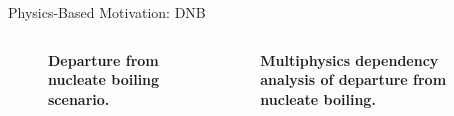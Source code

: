 \documentclass{beamer}
\begin{document}
\begin{frame}{Physics-Based Motivation: DNB}

  \begin{columns}

    \begin{column}{0.35\textwidth}
      \begin{figure}[htpb!]
        \begin{center}
          \scalebox{1}{  }
        \end{center}
        \caption{\textbf{Departure from nucleate boiling scenario.} }
      \end{figure}
    \end{column}

    \pause

    \begin{column}{0.65\textwidth}
      \begin{figure}[htpb!]
        \begin{center}
          \scalebox{0.8}{  }
        \end{center}
        \caption{\textbf{Multiphysics dependency analysis of departure
            from nucleate boiling.} }
      \end{figure}
    \end{column}

  \end{columns}

\end{frame}
\end{document}
